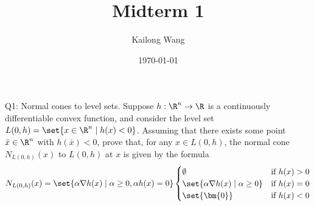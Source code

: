 \documentclass{article}
\title{Midterm 1}
\author{Kailong Wang}
\date{\today}
\theoremstyle{plain}
\theoremstyle{definition}
\theoremstyle{remark}
\begin{document}
\maketitle

\begin{problem}
    {Q1: Normal cones to level sets.}
    Suppose $h:\R^n\rightarrow\R$ is a continuously differentiable convex function, and consider the level set $L(0,h)=\set{x\in\R^n\mid h(x)<0}$. Assuming that there exists some point $\bar{x}\in\R^n$ with $h(\bar{x})<0$, prove that, for any $x\in L(0,h)$, the normal cone $N_{L(0,h)}(x)$ to $L(0,h)$ at $x$ is given by the formula
    \begin{align*}
        N_{L(0,h)}(x)=\set{\alpha\nabla h(x)\mid \alpha\geq 0, \alpha h(x)=0}
        \begin{cases}
            \emptyset & \text{if } h(x)>0 \\
            \set{\alpha\nabla h(x)\mid \alpha\geq 0} & \text{if } h(x)=0\\
            \set{\bm{0}} & \text{if } h(x)<0
        \end{cases}
    \end{align*}
\end{problem}
\end{document}
